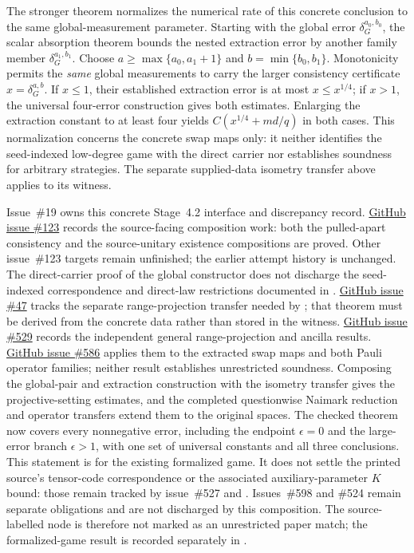\documentclass[11pt]{article}
\renewcommand{\ghissue}[1]{%
  \href{https://github.com/Dengnifer/MIPStarRE-A/issues/#1}{GitHub issue \##1}}
\begin{document}
The stronger theorem 
normalizes the numerical rate of this concrete conclusion to the same
global-measurement parameter. Starting with the global error
$\delta_G^{a_0,b_0}$, the scalar absorption theorem bounds the nested
extraction error by another family member $\delta_G^{a_1,b_1}$. Choose
$a\geq\max\{a_0,a_1+1\}$ and $b=\min\{b_0,b_1\}$. Monotonicity permits the
\emph{same} global measurements to carry the larger consistency certificate
$x=\delta_G^{a,b}$. If $x\leq1$, their established extraction error is at
most $x\leq x^{1/4}$; if $x>1$, the universal four-error construction gives
both estimates. Enlarging the extraction constant to at least four yields
$C(x^{1/4}+md/q)$ in both cases. This normalization concerns the concrete
swap maps only: it neither identifies the seed-indexed low-degree game with
the direct carrier nor establishes soundness for arbitrary strategies. The
separate supplied-data isometry transfer above applies to its witness.

Issue~\#19 owns this concrete Stage~4.2 interface and discrepancy record.
\ghissue{123} records the source-facing composition work: both the pulled-apart
consistency and the source-unitary existence compositions are proved. Other
issue~\#123 targets remain unfinished; the earlier attempt history is unchanged.
The direct-carrier proof of the global constructor does not discharge the
seed-indexed correspondence and direct-law restrictions documented in
.
\ghissue{47} tracks the separate range-projection transfer needed
by ; that theorem must be derived from the concrete data
rather than stored in the witness.
\ghissue{529} records the independent general range-projection and ancilla
results. \ghissue{586} applies them to the extracted swap maps and both Pauli
operator families; neither result establishes unrestricted soundness.
Composing the global-pair and extraction construction with the isometry
transfer gives the projective-setting estimates, and the completed
questionwise Naimark reduction and operator transfers extend them to the
original spaces. The checked theorem  now covers every
nonnegative error, including the endpoint $\epsilon=0$ and the large-error
branch $\epsilon>1$, with one set of universal constants and all three
conclusions. This statement is for the existing formalized game. It does not
settle the printed source's tensor-code correspondence or the associated
auxiliary-parameter $K$ bound: those remain tracked by issue~\#527 and
. Issues~\#598 and
\#524 remain separate obligations and are not discharged by this composition.
The source-labelled node  is therefore not marked as an
unrestricted paper match; the formalized-game result is recorded separately
in .
\end{document}
